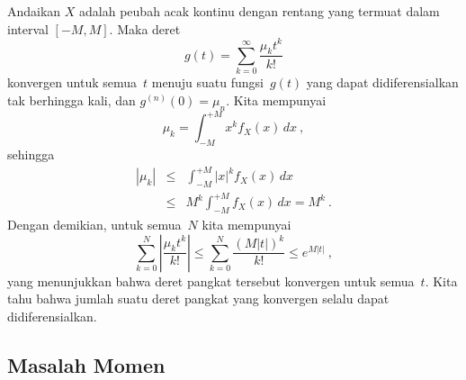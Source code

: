 \begin{theorem}\label{thm 10.4}
Andaikan $X$ adalah peubah acak kontinu dengan rentang yang termuat dalam
interval $[-M,M]$.  Maka deret
$$
g(t) = \sum_{k = 0}^\infty \frac{\mu_k t^k}{k!}
$$
konvergen untuk semua~$t$ menuju suatu fungsi~$g(t)$ yang dapat didiferensialkan tak berhingga kali, dan
$g^{(n)}(0) = \mu_n$.
\proof
Kita mempunyai
$$
\mu_k = \int_{-M}^{+M} x^k f_X(x)\, dx\ ,
$$
sehingga
\begin{eqnarray*}
|\mu_k| &\leq& \int_{-M}^{+M} |x|^k f_X(x)\, dx \\
        &\leq& M^k \int_{-M}^{+M} f_X(x)\, dx = M^k\ .
\end{eqnarray*}
Dengan demikian, untuk semua~$N$ kita mempunyai
$$
\sum_{k = 0}^N \left|\frac{\mu_k t^k}{k!}\right| \leq \sum_{k = 0}^N
\frac{(M|t|)^k}{k!} \leq e^{M|t|}\ ,
$$
yang menunjukkan bahwa deret pangkat tersebut konvergen untuk semua~$t$.  Kita tahu bahwa jumlah
suatu deret pangkat yang konvergen selalu dapat didiferensialkan.
\end{theorem}

\subsection*{Masalah Momen}

